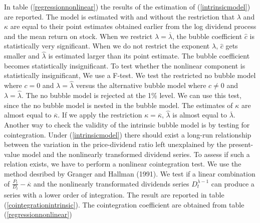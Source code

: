 \documentclass{article}
\begin{document}
In table (\ref{regressionnonlinear}) the results of the estimation of (\ref{intrinsicmodel}) are reported. The model is estimated with and without the restriction that $\lambda$ and $\kappa$ are equal to their point estimates obtained earlier from the log dividend process and the mean return on stock. When we restrict $\lambda = \overline{\lambda}$, the bubble coefficient $\widehat{c}$ is statistically very significant. When we do not restrict the exponent $\lambda $, $\widehat{c}$ gets smaller and $\widehat{\lambda}$ is estimated larger than its point estimate. The bubble coefficient becomes statistically insignificant. To test whether the nonlinear component is statistically insignificant, We use a F-test. We test  the restricted no bubble model where $c=0$ and $\lambda = \widehat{\lambda}$ versus the alternative bubble model where $ c \neq 0$ and  $ \lambda = \widehat{\lambda}$. The no bubble model is rejected at the 1\% level\footnotemark.  We can use this test, since the no bubble model is nested in the bubble model. The estimates of $\kappa$ are almost equal to $\overline{\kappa}$. If we apply the restriction $\kappa = \overline{\kappa}$, $\widehat{\lambda}$ is almost equal to $\overline{\lambda}$.
\\
Another way to check the validity of the intrinsic bubble model is by testing for cointegration. Under (\ref{intrinsicmodel}) there should exist a long-run relationship between the variation in the price-dividend ratio left unexplained by the present-value model and the nonlinearly transformed dividend series. To assess if such a relation exists, we have to perform a nonlinear cointegration test. We use the method desribed by Granger and Hallman (1991).
We test if a linear combination of $\frac{P_t}{D_t} - \overline{\kappa}$ and the nonlinearly transformated dividends series $D_t^{\lambda - 1}$ can produce a series with a lower order of integration. The result are reported in table (\ref{cointegrationintrinsic}). The cointegration coefficient are obtained from table (\ref{regressionnonlinear})
\end{document}
